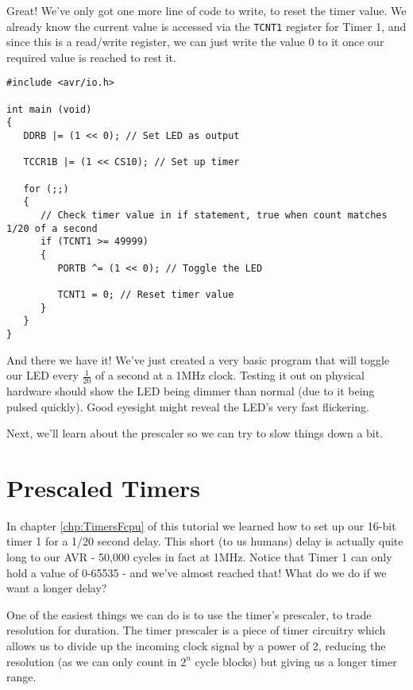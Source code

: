 \documentclass[a4paper,oneside,notitlepage]{book}
\begin{document}
Great! We've only got one more line of code to write, to reset the timer value. We already know the current value is accessed via the \texttt{TCNT1} register for Timer 1, and since this is a read/write register, we can just write the value 0 to it once our required value is reached to rest it.

\begin{center}
\begin{lstlisting}
#include <avr/io.h>

int main (void)
{
   DDRB |= (1 << 0); // Set LED as output

   TCCR1B |= (1 << CS10); // Set up timer

   for (;;)
   {
      // Check timer value in if statement, true when count matches 1/20 of a second
      if (TCNT1 >= 49999)
      {
         PORTB ^= (1 << 0); // Toggle the LED

         TCNT1 = 0; // Reset timer value
      }
   }
}
\end{lstlisting}
\end{center}

And there we have it! We've just created a very basic program that will toggle our LED every \(\frac{1}{20}\) of a second at a 1MHz clock. Testing it out on physical hardware should show the LED being dimmer than normal (due to it being pulsed quickly). Good eyesight might reveal the LED's very fast flickering.

Next, we'll learn about the prescaler so we can try to slow things down a bit.


\label{chp:PrescaledTimers}
\chapter{Prescaled Timers}

In chapter \ref{chp:TimersFcpu} of this tutorial we learned how to set up our 16-bit timer 1 for a 1/20 second delay. This short (to us humans) delay is actually quite long to our AVR - 50,000 cycles in fact at 1MHz. Notice that Timer 1 can only hold a value of 0-65535 - and we've almost reached that! What do we do if we want a longer delay?

One of the easiest things we can do is to use the timer's prescaler, to trade resolution for duration. The timer prescaler is a piece of timer circuitry which allows us to divide up the incoming clock signal by a power of 2, reducing the resolution (as we can only count in \(2^n\) cycle blocks) but giving us a longer timer range.
\end{document}
